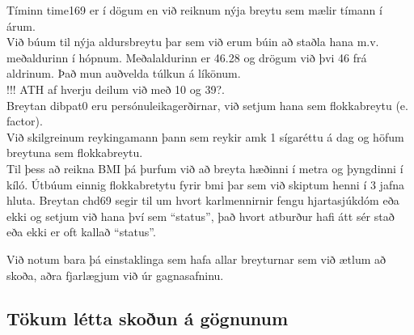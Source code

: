 \documentclass[
]{book}
\newenvironment{Shaded}{\begin{snugshade}}{\end{snugshade}}
\newcommand{\DataTypeTok}[1]{\textcolor[rgb]{0.13,0.29,0.53}{#1}}
\newcommand{\DecValTok}[1]{\textcolor[rgb]{0.00,0.00,0.81}{#1}}
\newcommand{\KeywordTok}[1]{\textcolor[rgb]{0.13,0.29,0.53}{\textbf{#1}}}
\newcommand{\NormalTok}[1]{#1}
\newcommand{\OperatorTok}[1]{\textcolor[rgb]{0.81,0.36,0.00}{\textbf{#1}}}
\newcommand{\StringTok}[1]{\textcolor[rgb]{0.31,0.60,0.02}{#1}}
\begin{document}
\begin{Shaded}
\end{Shaded}

Tíminn time169 er í dögum en við reiknum nýja breytu sem mælir tímann í árum.\\
Við búum til nýja aldursbreytu þar sem við erum búin að staðla hana m.v. meðaldurinn í hópnum. Meðalaldurinn er 46.28 og drögum við þvi 46 frá aldrinum. Það mun auðvelda túlkun á líkönum.\\
!!! ATH af hverju deilum við með 10 og 39?.\\
Breytan dibpat0 eru persónuleikagerðirnar, við setjum hana sem flokkabreytu (e. factor).\\
Við skilgreinum reykingamann þann sem reykir amk 1 sígaréttu á dag og höfum breytuna sem flokkabreytu.\\
Til þess að reikna BMI þá þurfum við að breyta hæðinni í metra og þyngdinni í kíló. Útbúum einnig flokkabretytu fyrir bmi þar sem við skiptum henni í 3 jafna hluta.
Breytan chd69 segir til um hvort karlmennirnir fengu hjartasjúkdóm eða ekki og setjum við hana því sem ``status'', það hvort atburður hafi átt sér stað eða ekki er oft kallað ``status''.

Við notum bara þá einstaklinga sem hafa allar breyturnar sem við ætlum að skoða, aðra fjarlægjum við úr gagnasafninu.

\hypertarget{tuxf6kum-luxe9tta-skouxf0un-uxe1-guxf6gnunum}{%
\subsection{Tökum létta skoðun á gögnunum}\label{tuxf6kum-luxe9tta-skouxf0un-uxe1-guxf6gnunum}}
\end{document}
